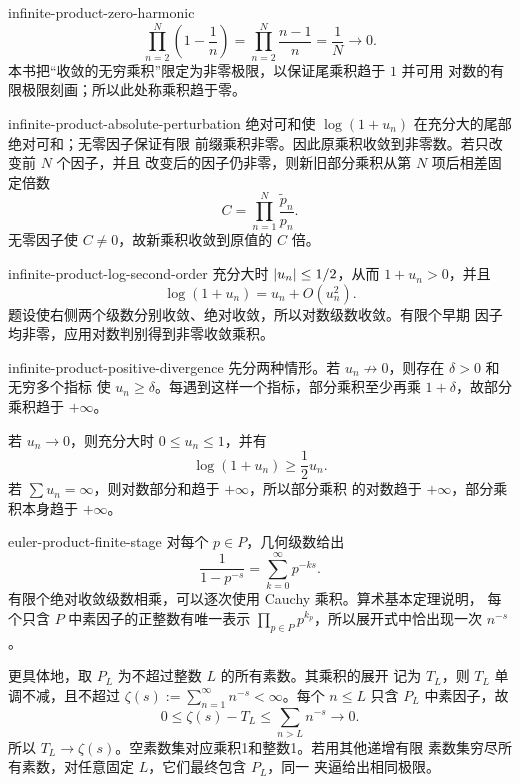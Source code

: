 \begin{solution}{infinite-product-zero-harmonic}
\[
 \prod_{n=2}^N\left(1-\frac1n\right)
 =\prod_{n=2}^N\frac{n-1}{n}
 =\frac1N\to0.
\]
本书把“收敛的无穷乘积”限定为非零极限，以保证尾乘积趋于 \(1\) 并可用
对数的有限极限刻画；所以此处称乘积趋于零。
\end{solution}

\begin{solution}{infinite-product-absolute-perturbation}
绝对可和使 \(\log(1+u_n)\) 在充分大的尾部绝对可和；无零因子保证有限
前缀乘积非零。因此原乘积收敛到非零数。若只改变前 \(N\) 个因子，并且
改变后的因子仍非零，则新旧部分乘积从第 \(N\) 项后相差固定倍数
\[
 C=\prod_{n=1}^N\frac{\widetilde p_n}{p_n}.
\]
无零因子使 \(C\ne0\)，故新乘积收敛到原值的 \(C\) 倍。
\end{solution}

\begin{solution}{infinite-product-log-second-order}
充分大时 \(\left|u_n\right|\le1/2\)，从而 \(1+u_n>0\)，并且
\[
 \log(1+u_n)=u_n+O(u_n^2).
\]
题设使右侧两个级数分别收敛、绝对收敛，所以对数级数收敛。有限个早期
因子均非零，应用对数判别得到非零收敛乘积。
\end{solution}

\begin{solution}{infinite-product-positive-divergence}
先分两种情形。若 \(u_n\not\to0\)，则存在 \(\delta>0\) 和无穷多个指标
使 \(u_n\ge\delta\)。每遇到这样一个指标，部分乘积至少再乘
\(1+\delta\)，故部分乘积趋于 \(+\infty\)。

若 \(u_n\to0\)，则充分大时 \(0\le u_n\le1\)，并有
\[
 \log(1+u_n)\ge\frac12u_n.
\]
若 \(\sum u_n=\infty\)，则对数部分和趋于 \(+\infty\)，所以部分乘积
的对数趋于 \(+\infty\)，部分乘积本身趋于 \(+\infty\)。
\end{solution}

\begin{solution}{euler-product-finite-stage}
对每个 \(p\in P\)，几何级数给出
\[
 \frac1{1-p^{-s}}=\sum_{k=0}^\infty p^{-ks}.
\]
有限个绝对收敛级数相乘，可以逐次使用 Cauchy 乘积。算术基本定理说明，
每个只含 \(P\) 中素因子的正整数有唯一表示
\(\prod_{p\in P}p^{k_p}\)，所以展开式中恰出现一次 \(n^{-s}\)。

更具体地，取 \(P_L\) 为不超过整数 \(L\) 的所有素数。其乘积的展开
记为 \(T_L\)，则 \(T_L\) 单调不减，且不超过
\(\zeta(s):=\sum_{n=1}^\infty n^{-s}<\infty\)。每个 \(n\le L\)
只含 \(P_L\) 中素因子，故
\[
 0\le\zeta(s)-T_L\le\sum_{n>L}n^{-s}\longrightarrow0.
\]
所以 \(T_L\to\zeta(s)\)。空素数集对应乘积1和整数1。若用其他递增有限
素数集穷尽所有素数，对任意固定 \(L\)，它们最终包含 \(P_L\)，同一
夹逼给出相同极限。
\end{solution}
